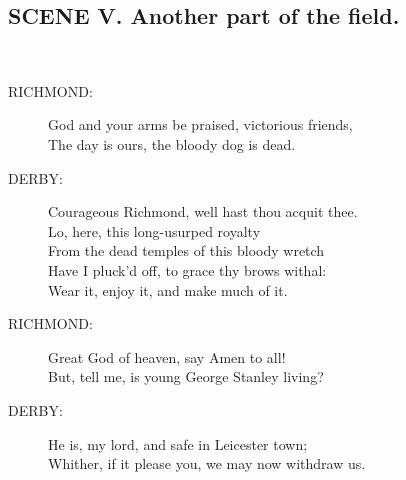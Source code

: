 \documentclass{article}
\begin{document}
\subsection*{SCENE V.  Another part of the field.}
\\
\begin{description}
\item[RICHMOND:] 
\hspace{1pt}God and your arms be praised, victorious friends,\\
\hspace{1pt}The day is ours, the bloody dog is dead.\\
\end{description}
\begin{description}
\item[DERBY:] 
\hspace{1pt}Courageous Richmond, well hast thou acquit thee.\\
\hspace{1pt}Lo, here, this long-usurped royalty\\
\hspace{1pt}From the dead temples of this bloody wretch\\
\hspace{1pt}Have I pluck'd off, to grace thy brows withal:\\
\hspace{1pt}Wear it, enjoy it, and make much of it.\\
\end{description}
\begin{description}
\item[RICHMOND:] 
\hspace{1pt}Great God of heaven, say Amen to all!\\
\hspace{1pt}But, tell me, is young George Stanley living?\\
\end{description}
\begin{description}
\item[DERBY:] 
\hspace{1pt}He is, my lord, and safe in Leicester town;\\
\hspace{1pt}Whither, if it please you, we may now withdraw us.\\
\end{description}
\end{document}
